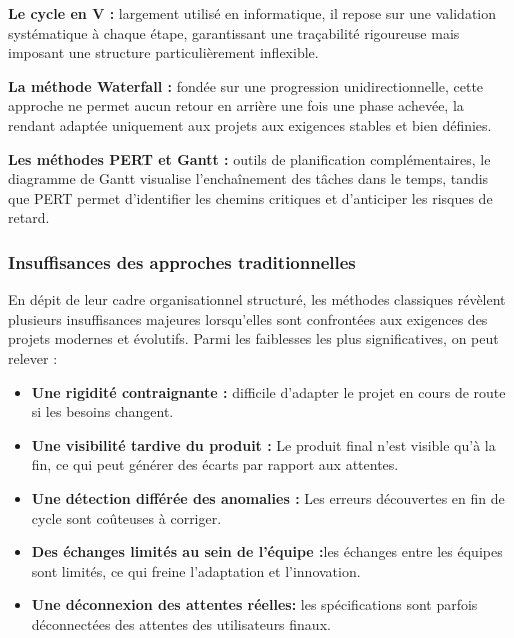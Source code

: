 \textbullet \hspace{0.2cm} \textbf{Le cycle en V :} largement utilisé en informatique, il repose sur une validation systématique à chaque étape, garantissant une traçabilité rigoureuse mais imposant une structure particulièrement inflexible.

\textbullet \hspace{0.2cm} \textbf{La méthode Waterfall :} fondée sur une progression unidirectionnelle, cette approche ne permet aucun retour en arrière une fois une phase achevée, la rendant adaptée uniquement aux projets aux exigences stables et bien définies.

\textbullet \hspace{0.2cm} \textbf{Les méthodes PERT et Gantt :} outils de planification complémentaires, le diagramme de Gantt visualise l'enchaînement des tâches dans le temps, tandis que PERT permet d'identifier les chemins critiques et d'anticiper les risques de retard.
    
\subsubsection{Insuffisances des approches traditionnelles }
 
En dépit de leur cadre organisationnel structuré, les méthodes classiques révèlent plusieurs insuffisances majeures lorsqu'elles sont confrontées aux exigences des projets modernes et évolutifs. Parmi les faiblesses les plus significatives, on peut relever :
	
	\begin{itemize}[label=\textbullet]
	\item	\textbf{Une rigidité contraignante :  }difficile d’adapter le projet en cours de route si les besoins changent.
    \item \textbf{Une visibilité tardive du produit :} Le produit final n’est visible qu’à la fin, ce qui peut générer des écarts par rapport aux attentes.
    
    \item \textbf{Une détection différée des anomalies :} Les erreurs découvertes en fin de cycle sont coûteuses à corriger.
    \item	\textbf{Des échanges limités au sein de l'équipe :}les échanges entre les équipes sont limités, ce qui freine l’adaptation et l’innovation.

    \item	\textbf{Une déconnexion des attentes réelles:} les spécifications sont parfois déconnectées des attentes des utilisateurs finaux.



	\end{itemize}

